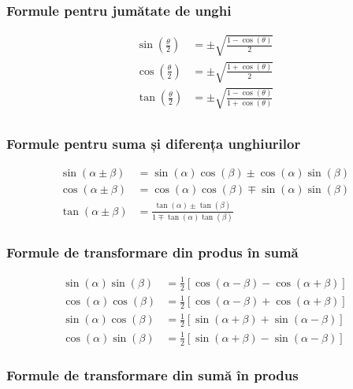 \documentclass[11pt,a4paper]{article}
\begin{document}
\subsubsection{Formule pentru jumătate de unghi}

\begin{align*}
\sin\left(\frac{\theta}{2}\right) &= \pm\sqrt{\frac{1 - \cos(\theta)}{2}} \\
\cos\left(\frac{\theta}{2}\right) &= \pm\sqrt{\frac{1 + \cos(\theta)}{2}} \\
\tan\left(\frac{\theta}{2}\right) &= \pm\sqrt{\frac{1 - \cos(\theta)}{1 + \cos(\theta)}} \\
\end{align*}
\subsubsection{Formule pentru suma și diferența unghiurilor}

\begin{align*}
\sin(\alpha \pm \beta) &= \sin(\alpha)\cos(\beta) \pm \cos(\alpha)\sin(\beta) \\
\cos(\alpha \pm \beta) &= \cos(\alpha)\cos(\beta) \mp \sin(\alpha)\sin(\beta) \\
\tan(\alpha \pm \beta) &= \frac{\tan(\alpha) \pm \tan(\beta)}{1 \mp \tan(\alpha)\tan(\beta)}
\end{align*}

\subsubsection{Formule de transformare din produs în sumă}

\begin{align*}
\sin(\alpha)\sin(\beta) &= \frac{1}{2} \left[ \cos(\alpha - \beta) - \cos(\alpha + \beta) \right] \\
\cos(\alpha)\cos(\beta) &= \frac{1}{2} \left[ \cos(\alpha - \beta) + \cos(\alpha + \beta) \right] \\
\sin(\alpha)\cos(\beta) &= \frac{1}{2} \left[ \sin(\alpha + \beta) + \sin(\alpha - \beta) \right] \\
\cos(\alpha)\sin(\beta) &= \frac{1}{2} \left[ \sin(\alpha + \beta) - \sin(\alpha - \beta) \right]
\end{align*}

\subsubsection{Formule de transformare din sumă în produs}
\end{document}
